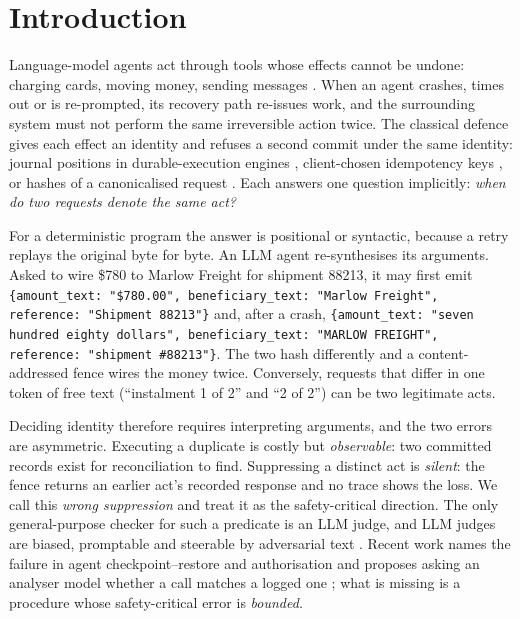 \section{Introduction}\label{sec:intro}

Language-model agents act through tools whose effects cannot be undone: charging cards, moving money, sending messages \citep{yao2023react,schick2023toolformer,yao2024taubench}. When an agent crashes, times out or is re-prompted, its recovery path re-issues work, and the surrounding system must not perform the same irreversible action twice. The classical defence gives each effect an identity and refuses a second commit under the same identity: journal positions in durable-execution engines \citep{temporal2026docs,restate2026docs}, client-chosen idempotency keys \citep{stripe2026idempotency}, or hashes of a canonicalised request \citep{kleppmann2017ddia}. Each answers one question implicitly: \emph{when do two requests denote the same act?}

For a deterministic program the answer is positional or syntactic, because a retry replays the original byte for byte. An LLM agent re-synthesises its arguments. Asked to wire \$780 to Marlow Freight for shipment 88213, it may first emit \texttt{\{amount\_text: "\$780.00", beneficiary\_text: "Marlow Freight", reference: "Shipment 88213"\}} and, after a crash, \texttt{\{amount\_text: "seven hundred eighty dollars", beneficiary\_text: "MARLOW FREIGHT", reference: "shipment \#88213"\}}. The two hash differently and a content-addressed fence wires the money twice. Conversely, requests that differ in one token of free text (``instalment 1 of 2'' and ``2 of 2'') can be two legitimate acts.

Deciding identity therefore requires interpreting arguments, and the two errors are asymmetric. Executing a duplicate is costly but \emph{observable}: two committed records exist for reconciliation to find. Suppressing a distinct act is \emph{silent}: the fence returns an earlier act's recorded response and no trace shows the loss. We call this \emph{wrong suppression} and treat it as the safety-critical direction. The only general-purpose checker for such a predicate is an LLM judge, and LLM judges are biased, promptable and steerable by adversarial text \citep{zheng2023judge,wang2023fair,greshake2023injection}. Recent work names the failure in agent checkpoint--restore and authorisation and proposes asking an analyser model whether a call matches a logged one \citep{zheng2026acrfence,xu2026caplease}; what is missing is a procedure whose safety-critical error is \emph{bounded}.

